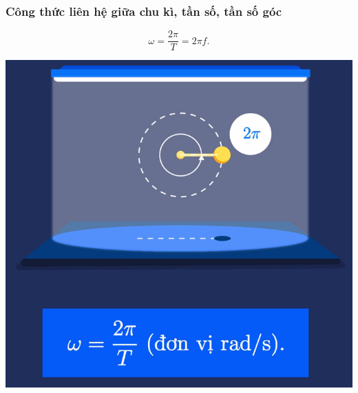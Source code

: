\subsubsection{Công thức liên hệ giữa chu kì, tần số, tần số góc}
\begin{equation*} \omega = \dfrac{2\pi}{T} = 2\pi f. \end{equation*}
\begin{center}
\includegraphics[scale=0.5]{../figs/VN12-PH-02-A-001-1-V2-2.png}
\end{center}
